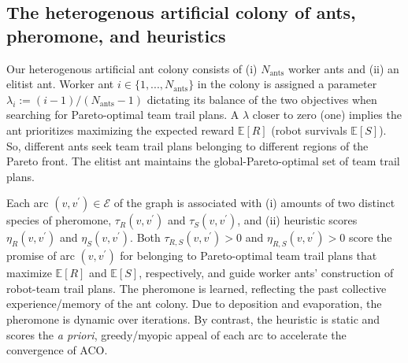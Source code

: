 \documentclass[fleqn,10pt,lineno]{wlpeerj}
\begin{document}
\subsection{The heterogenous artificial colony of ants, pheromone, and heuristics}
Our heterogenous artificial ant colony consists of (i) $N_{\text{ants}}$ worker ants and (ii) an elitist ant.
Worker ant $i\in\{1, ..., N_{\text{ants}}\}$ in the colony is assigned a parameter $\lambda_i := (i-1) / (N_{\text{ants}}-1)$ dictating its balance of the two objectives when searching for Pareto-optimal team trail plans.
A $\lambda$ closer to zero (one) implies the ant prioritizes maximizing the expected reward $\mathbb{E}[R]$ (robot survivals $\mathbb{E}[S]$). 
So, different ants seek team trail plans belonging to different regions of the Pareto front.
The elitist ant maintains the global-Pareto-optimal set of team trail plans.

Each arc $(v, v^\prime)\in\mathcal{E}$ of the graph is associated with 
(i) amounts of two distinct species of pheromone, $\tau_R(v, v^\prime)$ and $\tau_S(v, v^\prime)$, and 
(ii) heuristic scores $\eta_R(v, v^\prime)$ and $\eta_S(v, v^\prime)$.
Both $\tau_{R,S}(v, v^\prime)>0$ and $\eta_{R,S}(v, v^\prime)>0$ score the promise of arc $(v, v^\prime)$ for belonging to Pareto-optimal team trail plans that maximize $\mathbb{E}[R]$ and $\mathbb{E}[S]$, respectively, and guide worker ants' construction of robot-team trail plans.
The pheromone is learned, reflecting the past collective experience/memory of the ant colony. 
Due to deposition and evaporation, the pheromone is dynamic over iterations.
By contrast, the heuristic is static and scores the \emph{a priori}, greedy/myopic appeal of each arc to accelerate the convergence of ACO.
%
%
%
\end{document}
